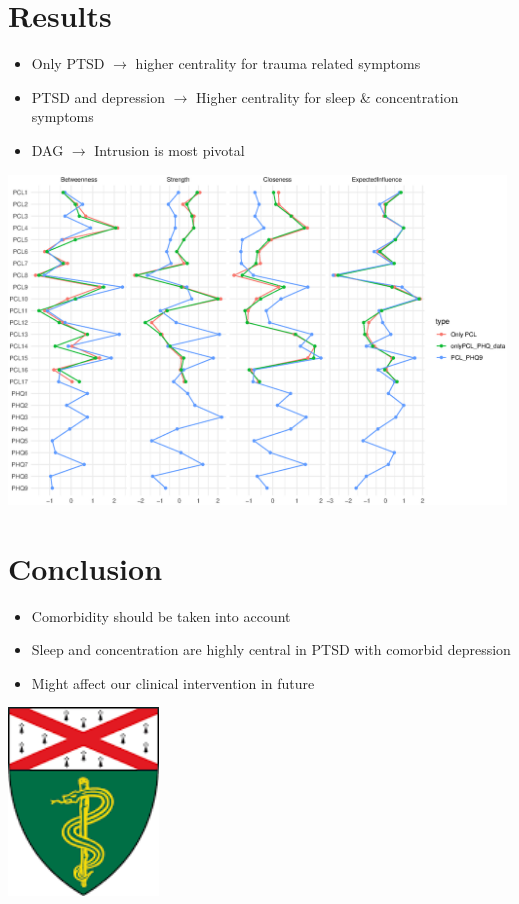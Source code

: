 \documentclass[]{betterposter}
\begin{document}
{\section{Results}
\begin{itemize}
    \item Only PTSD $\rightarrow$ higher centrality for trauma related symptoms
    \item PTSD and depression $\rightarrow$ Higher centrality for sleep \& concentration symptoms
    \item DAG $\rightarrow$ Intrusion is most pivotal
\end{itemize}

\begin{center}
    \includegraphics[width=0.99\textwidth]{img/centralityTotal.eps}
\end{center}

\section{Conclusion}
\begin{itemize}
    \item Comorbidity should be taken into account
    \item Sleep and concentration are highly central in PTSD with comorbid depression
    \item Might affect our clinical intervention in future 
\end{itemize}

\vfill

\begin{center}


\includegraphics[width=0.3\textwidth]{img/yalesm.png}\\
\end{center}
}{

}
\end{document}
